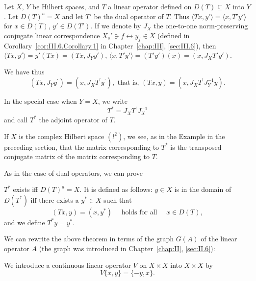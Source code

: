 \begin{definition}\label{def:VII.2.Definition.1} Let $X$, $Y$ be Hilbert spaces, and $T$ a linear operator defined on $D(T) \subseteq X$ into $Y$. Let $D(T)^{a} = X$ and let $T'$ be the dual operator of $T$. Thus $\langle Tx, y' \rangle = \langle x, T'y' \rangle$ for $x \in D(T)$, $y' \in D(T')$. If we denote by $J_{X}$ the one-to-one norm-preserving conjugate linear correspondence $X_{s}' \ni f \leftrightarrow y_{f} \in X$ (defined in Corollary~\ref{cor:III.6.Corollary.1} in Chapter~\ref{chap:III}, \ref{sec:III.6}), then $\langle Tx, y' \rangle = y'(Tx) = (Tx, J_{Y}y')$, $\langle x, T'y' \rangle = (T'y')(x) = (x, J_{X}T'y')$. 
\end{definition}

We have thus 
\[
(T x, J _{Y} y ^{\prime}) = (x, J _{X} T ^{\prime} y ^{\prime}), \text{ that is, } (T x, y) = (x, J _{X} T ^{\prime} J _{Y} ^{-1} y).
\]

In the special case when $Y = X$, we write 
\[
T ^{*} = J _{X} T ^{\prime} J _{X} ^{-1}
\]
and call $T^*$ the adjoint operator of $T$. 

\begin{remarku} If $X$ is the complex Hilbert space $(l^{2})$, we see, as in the Example in the preceding section, that the matrix corresponding to $T^{*}$ is the transposed conjugate matrix of the matrix corresponding to $T$. 
\end{remarku}

As in the case of dual operators, we can prove 

\begin{theorem}\label{thm:VII.2.Theorem.1} $T^*$ exists iff $D(T)^a = X$. It is defined as follows: $y \in X$ is in the domain of $D(T^*)$ iff there exists a $y^* \in X$ such that 
\begin{equation}\label{eq:VII.2.1}
(T x, y) = (x, y ^{*}) \quad \text{ holds for all } \quad x \in D (T),
\end{equation}
and we define $T^{*}y = y^{*}$. 
\end{theorem}

We can rewrite the above theorem in terms of the graph $G(A)$ of the linear operator $A$ (the graph was introduced in Chapter~\ref{chap:II}, \ref{sec:II.6}): 

\begin{theorem}\label{thm:VII.2.Theorem.2} We introduce a continuous linear operator $V$ on $X \times X$ into $X \times X$ by 
\begin{equation}\label{eq:VII.2.2}
V \{x, y \} = \{- y, x \}.
\end{equation}
\end{theorem}

